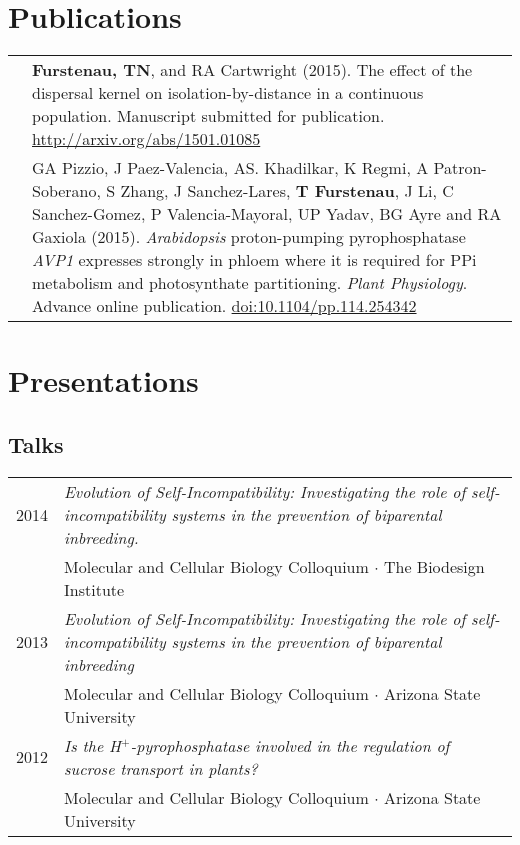 \documentclass[11pt]{article}
\begin{document}
\section*{Publications}
\renewcommand{\arraystretch}{1.5}
\begin{tabularx}{\linewidth}{l X}
&\textbf{Furstenau, TN}, and RA Cartwright (2015). The effect of the dispersal kernel on isolation-by-distance in a continuous population. Manuscript submitted for publication. \href{http://arxiv.org/abs/1501.01085}{http://arxiv.org/abs/1501.01085}\\
&GA Pizzio, J Paez-Valencia, AS. Khadilkar, K Regmi, A Patron-Soberano, S Zhang, J Sanchez-Lares, \textbf{T Furstenau}, J Li, C Sanchez-Gomez, P Valencia-Mayoral, UP Yadav, BG Ayre and RA Gaxiola (2015).\textit{ Arabidopsis} proton-pumping pyrophosphatase \textit{AVP1} expresses strongly in phloem where it is required for PPi metabolism and photosynthate partitioning. \textit{Plant Physiology}. Advance online publication. \href{http:/​/​dx.​doi.​org/​10.​1104/​pp.​114.​254342}{doi:10.1104/pp.114.254342}\\
\end{tabularx}
\section*{Presentations}
\subsection*{Talks}
\renewcommand{\arraystretch}{1}
\begin{tabularx}{\linewidth}{l X}
2014&\textit{Evolution of Self-Incompatibility: Investigating the role of self-incompatibility systems in the prevention of biparental inbreeding.}\\
&Molecular and Cellular Biology Colloquium $\cdotp$ The Biodesign Institute\\
2013&\textit{Evolution of Self-Incompatibility: Investigating the role of self-incompatibility systems in the prevention of biparental inbreeding}\\
&Molecular and Cellular Biology Colloquium $\cdotp$ Arizona State University\\
2012&\textit{Is the H$^+$-pyrophosphatase involved in the regulation of sucrose transport in plants?}\\
&Molecular and Cellular Biology Colloquium $\cdotp$ Arizona State University\\
\end{tabularx}
\end{document}
